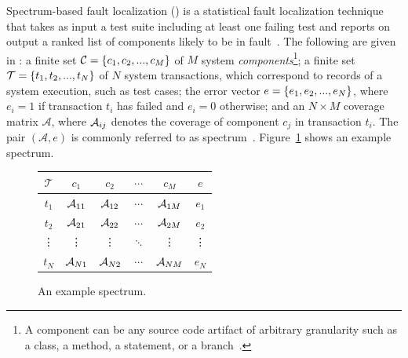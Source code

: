 \documentclass{article}
\begin{document}
Spectrum-based fault localization (\sfl) is a statistical fault
localization technique that takes as input a test suite including at
least one failing test and reports on output a ranked list of
components likely to be in fault~\cite{FLSurvey2016,DBLP:conf/kbse/JonesH05,DBLP:journals/smr/LuciaLJTB14,DBLP:journals/jss/AbreuZGG09}. The following are given in \sfl{}: a
finite set $\mathcal{C} = \{{}c_1,c_2,...,c_M\}$ of $M$ system
\emph{components}\footnote{A component can be any source code artifact
  of arbitrary granularity such as a class, a method, a statement, or
  a branch~\cite{DBLP:journals/stvr/HarroldRSWY00}.}; a finite set
$\mathcal{T} = \{{}t_1,t_2,...,t_N\}$ of $N$ system transactions,
which correspond to records of a system execution, such as test cases;
the error vector $e = \{{}e_1,e_2,...,e_N\}$, where $e_i = 1$ if
transaction $t_i$ has failed and $e_i = 0$ otherwise; and an $N \times
M$ coverage matrix $\mathcal{A}$, where $\mathcal{A}_{ij}$ denotes the coverage
of component $c_j$ in transaction $t_i$.  The pair $(\mathcal{A},e)$
is commonly referred to as
spectrum~\cite{DBLP:journals/stvr/HarroldRSWY00}. Figure~\ref{fig:spectrum-example}
shows an example spectrum.
\begin{figure}
  \vspace{-2ex}
  \hspace{-3ex}
  \centering
  \small
  \begin{tabular}{c|cccc|c}
    $\mathcal{T}$ & $c_1$    & $c_2$    & $\cdots$ & $c_M$    & $e$    \\ \hline
    $t_1$         & $\mathcal{A}_{11}$ & $\mathcal{A}_{12}$ & $\cdots$ & $\mathcal{A}_{1M}$ & $e_1$  \\
    $t_2$         & $\mathcal{A}_{21}$ & $\mathcal{A}_{22}$ & $\cdots$ & $\mathcal{A}_{2M}$ & $e_2$  \\
    \vdots        & \vdots   & \vdots   & $\ddots$ & \vdots   & \vdots \\
    $t_N$         & $\mathcal{A}_{N1}$ & $\mathcal{A}_{N2}$ & $\cdots$ & $\mathcal{A}_{NM}$ & $e_N$  \\
  \end{tabular}
  \caption{An example spectrum.}
  \label{fig:spectrum-example}
\end{figure}
\end{document}
